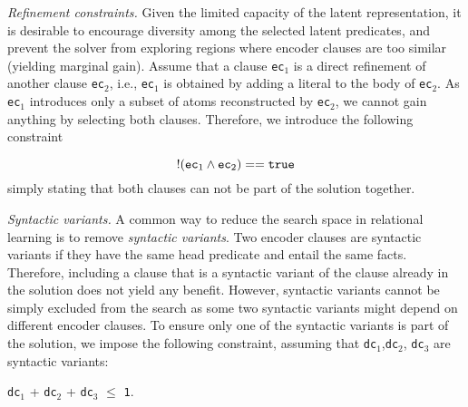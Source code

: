 \textit{Refinement constraints.}
Given the limited capacity of the latent representation, it is desirable to encourage diversity among the selected latent predicates, and prevent the solver from exploring regions where encoder clauses are too similar (yielding marginal gain).
Assume that a clause \texttt{ec}$_1$ is a direct refinement of another clause \texttt{ec}$_2$, i.e., \texttt{ec}$_1$ is obtained by adding a literal to the body of \texttt{ec}$_2$.
As \texttt{ec}$_1$ introduces only a subset of atoms reconstructed by \texttt{ec}$_2$, we cannot gain anything by selecting both clauses.
Therefore, we introduce the following constraint

$$ !(\text{\texttt{ec}}_1 \wedge \text{\texttt{ec}}_2) == \text{\texttt{true}} $$
simply stating that both clauses can not be part of the solution together.



\textit{Syntactic variants.}
A common way to reduce the search space in relational learning is to remove \textit{syntactic variants}.
Two encoder clauses are syntactic variants if they have the same head predicate and entail the same facts.
Therefore, including a clause that is a syntactic variant of the clause already in the solution does not yield any benefit.
However, syntactic variants cannot be simply excluded from the search as some two syntactic variants might depend on different encoder clauses.
To ensure only one of the syntactic variants is part of the solution, we impose the following constraint, assuming that \texttt{dc}$_1$,\texttt{dc}$_2$, \texttt{dc}$_3$ are syntactic variants:

\begin{center}
	\texttt{dc}$_1$ + \texttt{dc}$_2$ + \texttt{dc}$_3$ $\leq$ \texttt{1}.
\end{center}






%




